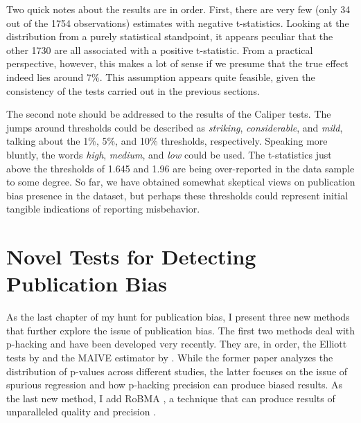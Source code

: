 {\begin{singlespace}
\begin{footnotesize}
\begin{longtable}[!htbp]{
@{\hskip\tabcolsep\extracolsep}
l
*{3}{c}
@{}
}
\end{longtable}
\end{footnotesize}
\end{singlespace}
}


Two quick notes about the results are in order. First, there are very few (only 34 out of the 1754 observations) estimates with negative t-statistics. Looking at the distribution from a purely statistical standpoint, it appears peculiar that the other 1730 are all associated with a positive t-statistic. From a practical perspective, however, this makes a lot of sense if we presume that the true effect indeed lies around 7\%. This assumption appears quite feasible, given the consistency of the tests carried out in the previous sections.

The second note should be addressed to the results of the Caliper tests. The jumps around thresholds could be described as \textit{striking}, \textit{considerable}, and \textit{mild}, talking about the 1\%, 5\%, and 10\% thresholds, respectively. Speaking more bluntly, the words \textit{high}, \textit{medium}, and \textit{low} could be used. The t-statistics just above the thresholds of 1.645 and 1.96 are being over-reported in the data sample to some degree. So far, we have obtained somewhat skeptical views on publication bias presence in the dataset, but perhaps these thresholds could represent initial tangible indications of reporting misbehavior.

\section{Novel Tests for Detecting Publication Bias}
\label{sec:phacking}

As the last chapter of my hunt for publication bias, I present three new methods that further explore the issue of publication bias. The first two methods deal with p-hacking and have been developed very recently. They are, in order, the Elliott tests by \cite{elliott2022hacking} and the \ac{MAIVE} estimator by \cite{irsova2023maive}. While the former paper analyzes the distribution of p-values across different studies, the latter focuses on the issue of spurious regression and how p-hacking precision can produce biased results. As the last new method, I add \ac{RoBMA} \citep{maier2022robust}, a technique that can produce results of unparalleled quality and precision \citep{bartovs2023robust}.


